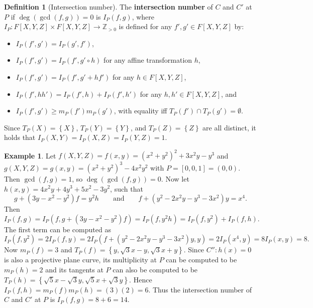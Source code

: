 \documentclass{article}
\newcommand{\Z}{\mathbb{Z}}
\newcommand{\rb}[1]{\left( #1 \right)}
\renewcommand{\sb}[1]{\left[ #1 \right]}
\newcommand{\cb}[1]{\left\{ #1 \right\}}
\theoremstyle{definition}\newtheorem*{definition}{Definition}
\theoremstyle{definition}\newtheorem*{example}{Example}
\theoremstyle{definition}\newtheorem*{remark}{Remark}
\begin{document}
\begin{definition}[Intersection number]
The \textbf{intersection number} of $ C $ and $ C' $ at $ P $ if $ \deg\rb{\gcd\rb{f, g}} = 0 $ is $ I_P\rb{f, g} $, where $ I_P : F\sb{X, Y, Z} \times F\sb{X, Y, Z} \to \Z_{> 0} $ is defined for any $ f', g' \in F\sb{X, Y, Z} $ by:
\begin{itemize}
\item $ I_P\rb{f', g'} = I_P\rb{g', f'} $,
\item $ I_P\rb{f', g'} = I_P\rb{f', g' \circ h} $ for any affine transformation $ h $,
\item $ I_P\rb{f', g'} = I_P\rb{f', g' + hf'} $ for any $ h \in F\sb{X, Y, Z} $,
\item $ I_P\rb{f', hh'} = I_P\rb{f', h} + I_P\rb{f', h'} $ for any $ h, h' \in F\sb{X, Y, Z} $, and
\item $ I_P\rb{f', g'} \ge m_P\rb{f'} m_P\rb{g'} $, with equality iff $ T_P\rb{f'} \cap T_P\rb{g'} = \emptyset $.
\end{itemize}
\end{definition}

Since $ T_P\rb{X} = \cb{X} $, $ T_P\rb{Y} = \cb{Y} $, and $ T_P\rb{Z} = \cb{Z} $ are all distinct, it holds that $ I_P\rb{X, Y} = I_P\rb{X, Z} = I_P\rb{Y, Z} = 1 $.

\pagebreak

\begin{example}
Let $ f\rb{X, Y, Z} = f\rb{x, y} = \rb{x^2 + y^2}^2 + 3x^2y - y^3 $ and $ g\rb{X, Y, Z} = g\rb{x, y} = \rb{x^2 + y^2}^3 - 4x^2y^2 $ with $ P = \sb{0, 0, 1} = \rb{0, 0} $. Then $ \gcd\rb{f, g} = 1 $, so $ \deg\rb{\gcd\rb{f, g}} = 0 $. Now let $ h\rb{x, y} = 4x^2y + 4y^3 + 5x^2 - 3y^2 $, such that
$$ g + \rb{3y - x^2 - y^2}f = y^2h \qquad \text{and} \qquad f + \rb{y^2 - 2x^2y - y^3 - 3x^2}y = x^4. $$
Then
$$ I_P\rb{f, g} = I_P\rb{f, g + \rb{3y - x^2 - y^2}f} = I_P\rb{f, y^2h} = I_P\rb{f, y^2} + I_P\rb{f, h}. $$
The first term can be computed as
$$ I_P\rb{f, y^2} = 2I_P\rb{f, y} = 2I_P\rb{f + \rb{y^2 - 2x^2y - y^3 - 3x^2}y, y} = 2I_P\rb{x^4, y} = 8I_P\rb{x, y} = 8. $$
Now $ m_P\rb{f} = 3 $ and $ T_P\rb{f} = \cb{y, \sqrt{3}x - y, \sqrt{3}x + y} $. Since $ C'' : h\rb{x} = 0 $ is also a projective plane curve, its multiplicity at $ P $ can be computed to be $ m_P\rb{h} = 2 $ and its tangents at $ P $ can also be computed to be $ T_P\rb{h} = \cb{\sqrt{5}x - \sqrt{3}y, \sqrt{5}x + \sqrt{3}y} $. Hence $ I_P\rb{f, h} = m_P\rb{f} m_P\rb{h} = \rb{3}\rb{2} = 6 $. Thus the intersection number of $ C $ and $ C' $ at $ P $ is $ I_P\rb{f, g} = 8 + 6 = 14 $.
\end{example}
\end{document}
